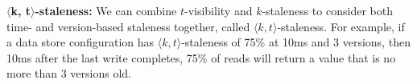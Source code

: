 \textbf{$\langle$k, t$\rangle$-staleness:} We can combine $t$-visibility
and $k$-staleness to consider both time- and version-based staleness
together, called $\langle k, t \rangle$-staleness. For example, if a
data store configuration has $\langle k, t \rangle$-staleness of 75\%
at 10ms and 3 versions, then 10ms after the last write completes, 75\%
of reads will return a value that is no more than 3 versions old.



